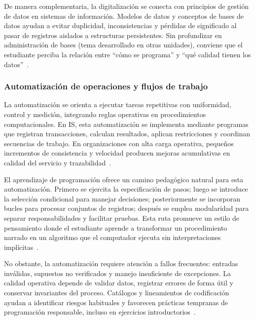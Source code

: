 \documentclass[12pt,twoside]{book}
\begin{document}
						De manera complementaria, la digitalización se conecta con principios de gestión de datos en sistemas de información. Modelos de datos y conceptos de bases de datos ayudan a evitar duplicidad, inconsistencias y pérdidas de significado al pasar de registros aislados a estructuras persistentes. Sin profundizar en administración de bases (tema desarrollado en otras unidades), conviene que el estudiante perciba la relación entre “cómo se programa” y “qué calidad tienen los datos”~\cite{Elmasri2016Database,Silberschatz2020Database,Date2019Database}.
						
					\subsubsection{Automatización de operaciones y flujos de trabajo}
						\noindent
						La automatización se orienta a ejecutar tareas repetitivas con uniformidad, control y medición, integrando reglas operativas en procedimientos computacionales. En IS, esta automatización se implementa mediante programas que registran transacciones, calculan resultados, aplican restricciones y coordinan secuencias de trabajo. En organizaciones con alta carga operativa, pequeños incrementos de consistencia y velocidad producen mejoras acumulativas en calidad del servicio y trazabilidad~\cite{Laudon2020Management,Kendall2014Systems,Gonzalez-Longatt2007Introduccion}.
						
						El aprendizaje de programación ofrece un camino pedagógico natural para esta automatización. Primero se ejercita la especificación de pasos; luego se introduce la selección condicional para manejar decisiones; posteriormente se incorporan bucles para procesar conjuntos de registros; después se emplea modularidad para separar responsabilidades y facilitar pruebas. Esta ruta promueve un estilo de pensamiento donde el estudiante aprende a transformar un procedimiento narrado en un algoritmo que el computador ejecuta sin interpretaciones implícitas~\cite{Wirth1976Algorithms,Hanly2015Problem,Gaddis2022Starting}.
						
						No obstante, la automatización requiere atención a fallos frecuentes: entradas inválidas, supuestos no verificados y manejo insuficiente de excepciones. La calidad operativa depende de validar datos, registrar errores de forma útil y conservar invariantes del proceso. Catálogos y lineamientos de codificación ayudan a identificar riesgos habituales y favorecen prácticas tempranas de programación responsable, incluso en ejercicios introductorios~\cite{ISO247722024Programming,Ghezzi2003Fundamentals,Sommerville2015Software}.
						
\end{document}
